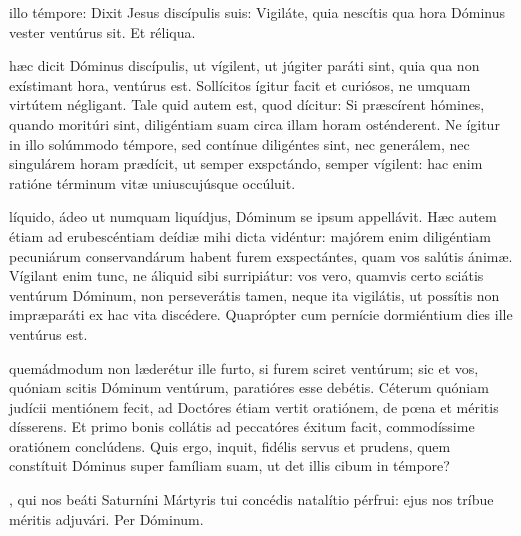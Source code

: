 \documentclass[fontsize=9pt,paper=A6,twoside,BCOR=1mm,DIV=22,headinclude]{scrarticle}
\begin{document}
\begin{multicols}{2}
\RVCPvi 

 illo témpore: Dixit Jesus discípulis suis: Vigiláte, quia nescítis qua hora Dóminus vester ventúrus sit. Et réliqua.

 hæc dicit Dóminus discípulis, ut vígilent, ut júgiter paráti sint, quia qua non exístimant hora, ventúrus est. Sollícitos ígitur facit et curiósos, ne umquam virtútem négligant. Tale quid autem est, quod dícitur: Si præscírent hómines, quando moritúri sint, diligéntiam suam circa illam horam osténderent. Ne ígitur in illo solúmmodo témpore, sed contínue diligéntes sint, nec generálem, nec singulárem horam prædícit, ut semper exspctándo, semper vígilent: hac enim ratióne términum vitæ uniuscujúsque occúluit. 

\RVCPvii 

 líquido, ádeo ut numquam liquídjus, Dóminum se ipsum appellávit. Hæc autem étiam ad erubescéntiam deídiæ mihi dicta vidéntur: majórem enim diligéntiam pecuniárum conservandárum habent furem exspectántes, quam vos salútis ánimæ. Vígilant enim tunc, ne áliquid sibi surripiátur: vos vero, quamvis certo sciátis ventúrum Dóminum, non perseverátis tamen, neque ita vigilátis, ut possítis non impræparáti ex hac vita discédere. Quaprópter cum pernície dormiéntium dies ille ventúrus est.

\RVCPviii 

 quemádmodum non læderétur ille furto, si furem sciret ventúrum; sic et vos, quóniam scitis Dóminum ventúrum, paratióres esse debétis. Céterum quóniam judícii mentiónem fecit, ad Doctóres étiam vertit oratiónem, de pœna et méritis dísserens. Et primo bonis collátis ad peccatóres éxitum facit, commodíssime oratiónem conclúdens. Quis ergo, inquit, fidélis servus et prudens, quem constítuit Dóminus super famíliam suam, ut det illis cibum in témpore?

\Te



\AiiM 

\VRMii 

, qui nos beáti Saturníni Mártyris tui concédis natalítio pérfrui: ejus nos tríbue méritis adjuvári. Per Dóminum.


\end{multicols}
\end{document}
